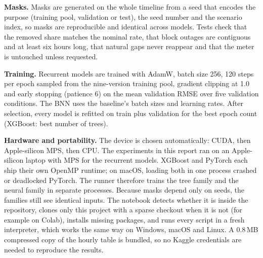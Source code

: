 \textbf{Masks.} Masks are generated on the whole timeline from a seed that encodes the purpose (training pool, validation or test), the seed number and the scenario index, so masks are reproducible and identical across models. Tests check that the removed share matches the nominal rate, that block outages are contiguous and at least six hours long, that natural gaps never reappear and that the meter is untouched unless requested.

\textbf{Training.} Recurrent models are trained with AdamW, batch size 256, 120 steps per epoch sampled from the nine-version training pool, gradient clipping at 1.0 and early stopping (patience 6) on the mean validation RMSE over five validation conditions. The BNN uses the baseline's batch sizes and learning rates. After selection, every model is refitted on train plus validation for the best epoch count (XGBoost: best number of trees).

\textbf{Hardware and portability.} The device is chosen automatically: CUDA, then Apple-silicon MPS, then CPU. The experiments in this report ran on an Apple-silicon laptop with MPS for the recurrent models. XGBoost and PyTorch each ship their own OpenMP runtime; on macOS, loading both in one process crashed or deadlocked PyTorch. The runner therefore trains the tree family and the neural family in separate processes. Because masks depend only on seeds, the families still see identical inputs. The notebook detects whether it is inside the repository, clones only this project with a sparse checkout when it is not (for example on Colab), installs missing packages, and runs every script in a fresh interpreter, which works the same way on Windows, macOS and Linux. A 0.8\,MB compressed copy of the hourly table is bundled, so no Kaggle credentials are needed to reproduce the results.
